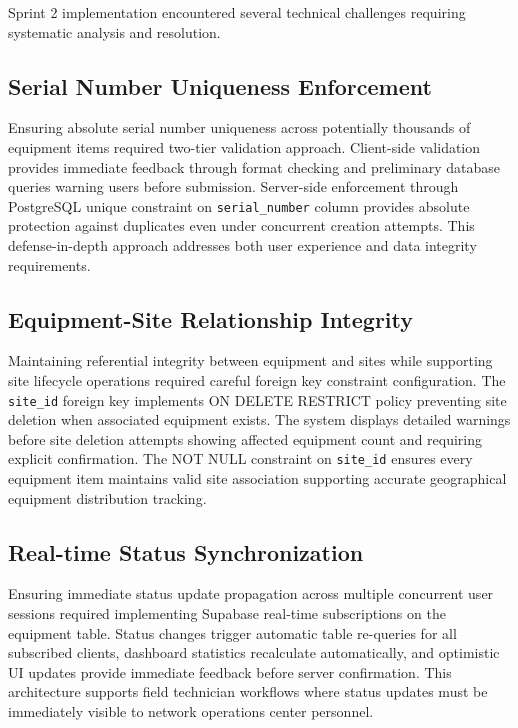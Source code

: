 Sprint 2 implementation encountered several technical challenges requiring systematic analysis and resolution.

\subsection{Serial Number Uniqueness Enforcement}

Ensuring absolute serial number uniqueness across potentially thousands of equipment items required two-tier validation approach. Client-side validation provides immediate feedback through format checking and preliminary database queries warning users before submission. Server-side enforcement through PostgreSQL unique constraint on \texttt{serial\_number} column provides absolute protection against duplicates even under concurrent creation attempts. This defense-in-depth approach addresses both user experience and data integrity requirements.

\subsection{Equipment-Site Relationship Integrity}

Maintaining referential integrity between equipment and sites while supporting site lifecycle operations required careful foreign key constraint configuration. The \texttt{site\_id} foreign key implements ON DELETE RESTRICT policy preventing site deletion when associated equipment exists. The system displays detailed warnings before site deletion attempts showing affected equipment count and requiring explicit confirmation. The NOT NULL constraint on \texttt{site\_id} ensures every equipment item maintains valid site association supporting accurate geographical equipment distribution tracking.

\subsection{Real-time Status Synchronization}

Ensuring immediate status update propagation across multiple concurrent user sessions required implementing Supabase real-time subscriptions on the equipment table. Status changes trigger automatic table re-queries for all subscribed clients, dashboard statistics recalculate automatically, and optimistic UI updates provide immediate feedback before server confirmation. This architecture supports field technician workflows where status updates must be immediately visible to network operations center personnel.


